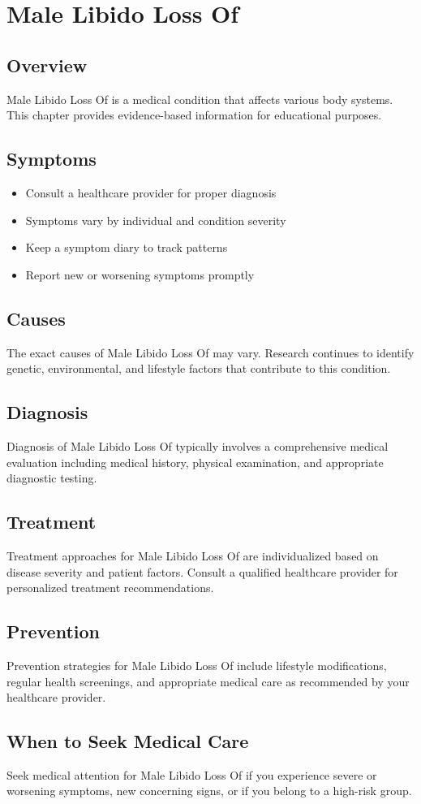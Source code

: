\chapter{Male Libido Loss Of}

\section*{Overview}
Male Libido Loss Of is a medical condition that affects various body systems. This chapter provides evidence-based information for educational purposes.

\section*{Symptoms}
\begin{itemize}
  \item Consult a healthcare provider for proper diagnosis
  \item Symptoms vary by individual and condition severity
  \item Keep a symptom diary to track patterns
  \item Report new or worsening symptoms promptly
\end{itemize}

\section*{Causes}
The exact causes of Male Libido Loss Of may vary. Research continues to identify genetic, environmental, and lifestyle factors that contribute to this condition.

\section*{Diagnosis}
Diagnosis of Male Libido Loss Of typically involves a comprehensive medical evaluation including medical history, physical examination, and appropriate diagnostic testing.

\section*{Treatment}
Treatment approaches for Male Libido Loss Of are individualized based on disease severity and patient factors. Consult a qualified healthcare provider for personalized treatment recommendations.

\section*{Prevention}
Prevention strategies for Male Libido Loss Of include lifestyle modifications, regular health screenings, and appropriate medical care as recommended by your healthcare provider.

\section*{When to Seek Medical Care}
Seek medical attention for Male Libido Loss Of if you experience severe or worsening symptoms, new concerning signs, or if you belong to a high-risk group.
\clearpage
